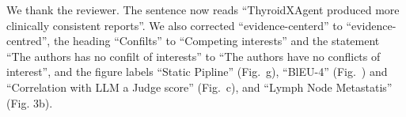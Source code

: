We thank the reviewer. The sentence now reads ``ThyroidXAgent produced more clinically consistent reports''. We also corrected ``evidence-centerd'' to ``evidence-centred'', the heading ``Confilts'' to ``Competing interests'' and the statement ``The authors has no confilt of interests'' to ``The authors have no conflicts of interest'', and the figure labels ``Static Pipline'' (Fig.~\FigReportGen{}g), ``BlEU-4'' (Fig.~\FigThyClin{}) and ``Correlation with LLM a Judge score'' (Fig.~\FigThyClin{}c), and ``Lymph Node Metastatis'' (Fig. 3b).\par
